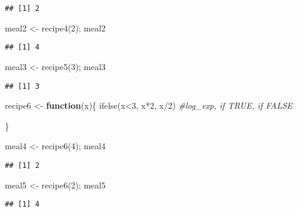 \documentclass[
]{article}
\newenvironment{Shaded}{\begin{snugshade}}{\end{snugshade}}
\newcommand{\CommentTok}[1]{\textcolor[rgb]{0.56,0.35,0.01}{\textit{#1}}}
\newcommand{\ControlFlowTok}[1]{\textcolor[rgb]{0.13,0.29,0.53}{\textbf{#1}}}
\newcommand{\DecValTok}[1]{\textcolor[rgb]{0.00,0.00,0.81}{#1}}
\newcommand{\FunctionTok}[1]{\textcolor[rgb]{0.00,0.00,0.00}{#1}}
\newcommand{\NormalTok}[1]{#1}
\newcommand{\OtherTok}[1]{\textcolor[rgb]{0.56,0.35,0.01}{#1}}
\newcommand{\SpecialCharTok}[1]{\textcolor[rgb]{0.00,0.00,0.00}{#1}}
\begin{document}
\begin{verbatim}
## [1] 2
\end{verbatim}

\begin{Shaded}
\begin{Highlighting}[]
\NormalTok{meal2 }\OtherTok{\textless{}{-}} \FunctionTok{recipe4}\NormalTok{(}\DecValTok{2}\NormalTok{); meal2}
\end{Highlighting}
\end{Shaded}

\begin{verbatim}
## [1] 4
\end{verbatim}

\begin{Shaded}
\begin{Highlighting}[]
\NormalTok{meal3 }\OtherTok{\textless{}{-}} \FunctionTok{recipe5}\NormalTok{(}\DecValTok{3}\NormalTok{); meal3}
\end{Highlighting}
\end{Shaded}

\begin{verbatim}
## [1] 3
\end{verbatim}

\begin{Shaded}
\begin{Highlighting}[]
\NormalTok{recipe6 }\OtherTok{\textless{}{-}} \ControlFlowTok{function}\NormalTok{(x)\{}
  \FunctionTok{ifelse}\NormalTok{(x}\SpecialCharTok{\textless{}}\DecValTok{3}\NormalTok{, x}\SpecialCharTok{*}\DecValTok{2}\NormalTok{, x}\SpecialCharTok{/}\DecValTok{2}\NormalTok{) }\CommentTok{\#log\_exp, if TRUE, if FALSE}
  
\NormalTok{\}}

\NormalTok{meal4 }\OtherTok{\textless{}{-}} \FunctionTok{recipe6}\NormalTok{(}\DecValTok{4}\NormalTok{); meal4}
\end{Highlighting}
\end{Shaded}

\begin{verbatim}
## [1] 2
\end{verbatim}

\begin{Shaded}
\begin{Highlighting}[]
\NormalTok{meal5 }\OtherTok{\textless{}{-}} \FunctionTok{recipe6}\NormalTok{(}\DecValTok{2}\NormalTok{); meal5}
\end{Highlighting}
\end{Shaded}

\begin{verbatim}
## [1] 4
\end{verbatim}
\end{document}
